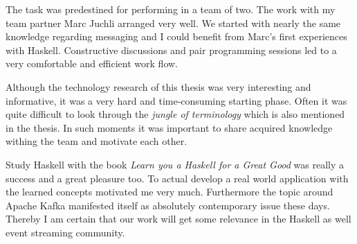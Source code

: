 The task was predestined for performing in a team of two. The work with my team
partner Marc Juchli arranged very well. We started with nearly the same
knowledge regarding messaging and I could benefit from Marc's first experiences
with Haskell. Constructive discussions and pair programming sessions led to a
very comfortable and efficient work flow.

Although the technology research of this thesis was very interesting and
informative, it was a very hard and time-consuming starting phase. Often it was
quite difficult to look through the \textit{jungle of terminology} which is also
mentioned in the thesis. In such moments it was important to share acquired
knowledge withing the team and motivate each other.

Study Haskell with the book \textit{Learn you a Haskell for a Great Good} was
really a success and a great pleasure too. To actual develop a real world
application with the learned concepts motivated me very much. Furthermore
the topic around Apache Kafka manifested itself as absolutely contemporary issue
these days. Thereby I am certain that our work will get some relevance in
the Haskell as well event streaming community.



